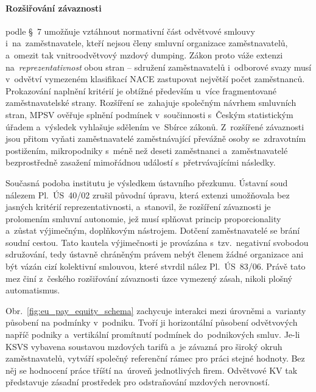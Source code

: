 \paragraph{Rozšiřování závaznosti } podle \mbox{§~7}  umožňuje vztáhnout normativní část odvětvové smlouvy i~na~zaměstnavatele, kteří nejsou členy smluvní organizace zaměstnavatelů, a~omezit tak vnitroodvětvový mzdový dumping. Zákon proto váže extenzi na~\textit{reprezentativnost} obou stran -- sdružení zaměstnavatelů i~odborové svazy musí v~odvětví vymezeném klasifikací \acs{NACE} zastupovat největší počet zaměstnanců. Prokazování naplnění kritérií je obtížné především u~více fragmentované zaměstnavatelské strany. Rozšíření se~zahajuje společným návrhem smluvních stran, \ac{MPSV} ověřuje splnění podmínek v~součinnosti s~Českým statistickým úřadem a~výsledek vyhlašuje sdělením ve~Sbírce zákonů. Z~rozšířené závaznosti jsou přitom vyňati zaměstnavatelé zaměstnávající převážně osoby se~zdravotním postižením, mikropodniky s~méně než deseti zaměstnanci a~zaměstnavatelé bezprostředně zasažení mimořádnou událostí s~přetrvávajícími následky.~\cite{zakon_kv_1991}~\cite{sdeleni_17_2026}~\cite{sdeleni_47_2026}\par

Současná podoba institutu je výsledkem ústavního přezkumu. Ústavní soud nálezem \mbox{Pl.~ÚS~40/02} zrušil původní úpravu, která extenzi umožňovala bez jasných kritérií reprezentativnosti, a~stanovil, že rozšíření závaznosti je prolomením smluvní autonomie, jež musí splňovat princip proporcionality a~zůstat výjimečným, doplňkovým nástrojem. Dotčení zaměstnavatelé se brání soudní cestou. Tato kautela výjimečnosti je provázána s~tzv.~negativní svobodou sdružování, tedy ústavně chráněným právem nebýt členem žádné organizace ani být vázán cizí kolektivní smlouvou, které stvrdil nález \mbox{Pl.~ÚS~83/06}. Právě tato mez činí z~českého rozšiřování závaznosti úzce vymezený zásah, nikoli plošný automatismus.~\cite{uscr_pl_us_40_02}~\cite{uscr_pl_us_83_06}\par

Obr.~\ref{fig:eu_pay_equity_schema} zachycuje interakci mezi úrovněmi  a~varianty působení na podmínky v~podniku. Tvoří ji horizontální působení odvětvových  napříč podniky a~vertikální promítnutí podmínek do~podnikových smluv. Je-li \ac{KSVS} vybavena soustavou mzdových tarifů a~je závazná pro široký okruh zaměstnavatelů, vytváří společný referenční rámec pro práci stejné hodnoty. Bez něj se hodnocení práce tříští na~úroveň jednotlivých firem. Odvětvové \ac{KV} tak představuje zásadní prostředek pro odstraňování mzdových nerovností.\par

